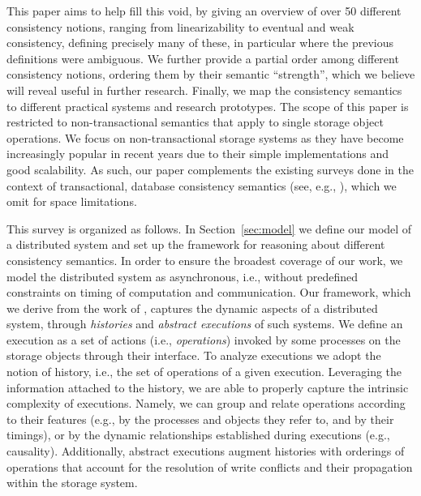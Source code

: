 \documentclass[letter, 11pt]{article}
\newcommand{\citeN}{\citet}
\renewcommand{\cite}{\citep}
\begin{document}
This paper aims to help fill this void, by giving an overview of over 50 different consistency notions, ranging from linearizability to eventual and weak consistency, defining precisely many of these, in particular where the previous definitions were ambiguous. We further provide a partial order among different consistency notions, ordering them by their semantic ``strength'', which we believe will reveal useful in further research. Finally, we map the consistency semantics to different practical systems and research prototypes. The scope of this paper is restricted to non-transactional semantics that apply to single storage object operations. 
We focus on non-transactional storage systems as they have become increasingly popular in recent years due to their simple implementations and good scalability. As such, our paper complements the existing surveys done in the context of transactional, database consistency semantics (see, e.g., \cite{Adya:99}), which we omit for space limitations. 



\vspace{0.2cm}
This survey is organized as follows.
In Section~\ref{sec:model} we define our model of a distributed system and set up the framework for reasoning about different consistency semantics. 
In order to ensure the broadest coverage of our work, 
we model the distributed system as asynchronous, 
i.e., without predefined constraints on timing of computation and communication. Our framework, which we derive from the work of \citeN{Burckhardt:14}, captures the 
dynamic aspects of a distributed system, through 
\emph{histories} and \emph{abstract executions} of such systems.
We define an execution as a set of actions (i.e., \emph{operations}) invoked by some processes 
on the storage objects through their interface.
To analyze executions we adopt the notion of history, i.e., the set of operations of a given execution.
Leveraging the information attached to the history, we are able 
to properly capture the intrinsic complexity of executions.
Namely, we can group and relate operations according to their features 
(e.g., by the processes and objects they refer to, and by their timings),
or by the dynamic relationships established during executions (e.g., causality).
Additionally, abstract executions augment histories with orderings of operations that account 
for the resolution of write conflicts and their propagation within the storage system.
\end{document}
